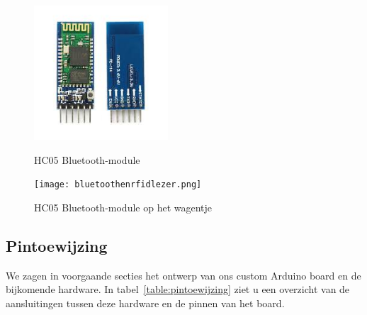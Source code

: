 \begin{figure}[H]
	\centering
	\begin{minipage}[b]{0.4\textwidth}
		\centering
		\includegraphics[height=5cm]{hc05.png}
		\caption{HC05 Bluetooth-module\label{fig:hc05}}
	\end{minipage}
	\hfill
	\begin{minipage}[b]{0.4\textwidth}
		\centering
		\texttt{[image: bluetoothenrfidlezer.png]}
		\caption{HC05 Bluetooth-module op het wagentje\label{fig:hc05montage}}
	\end{minipage}
\end{figure}

\subsection{Pintoewijzing}
We zagen in voorgaande secties het ontwerp van ons custom Arduino board en de bijkomende hardware. In tabel~\ref{table:pintoewijzing} ziet u een overzicht van de aansluitingen tussen deze hardware en de pinnen van het board.

